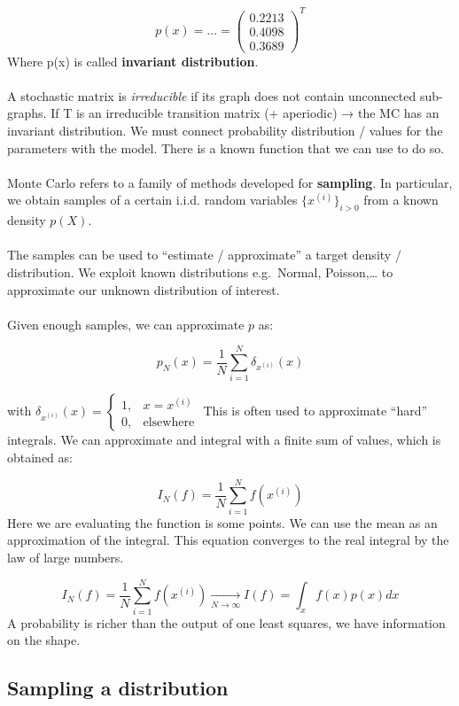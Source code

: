 $$
p(x)=\dots = \begin{pmatrix} 0.2213 \\ 0.4098 \\ 0.3689\end{pmatrix}^T
$$
Where p(x) is called \textbf{invariant distribution}.
\\
\\
\noindent
A stochastic matrix is \emph{irreducible} if its graph does not contain
unconnected sub-graphs. If T is an irreducible transition matrix (+ aperiodic) → the MC has an
invariant distribution.
\noindent
We must connect probability distribution / values for the parameters
with the model. There is a known function that we can use to do so.
\\
\\
\noindent
Monte Carlo refers to a family of methods developed for
\textbf{sampling}. In particular, we obtain samples of a certain i.i.d.
random variables $\{x^{(i)}\}_{i>0}$ from a known density $p(X)$.
\\
\\
\noindent
The samples can be used to ``estimate / approximate'' a target density /
distribution. We exploit known distributions e.g.~Normal,
Poisson,\ldots{} to approximate our unknown distribution of interest.
\\
\\
\noindent
Given enough samples, we can approximate $p$ as:

$$
p_N(x)= \frac{1}{N}\sum^N_{i=1}\delta_{x^{(i)}}(x)
$$

with
$\delta_{x^{(i)}}(x)= \begin{cases}1, & x=x^{(i)} \\ 0, & \text{elsewhere}\end{cases}$
\noindent
This is often used to approximate ``hard'' integrals. We can approximate
and integral with a finite sum of values, which is obtained as:

$$
I_N(f)=\frac{1}{N} \sum^N_{i=1} f(x^{(i)})
$$
\noindent
Here we are evaluating the function is some points. We can use the mean
as an approximation of the integral. This equation converges to the real
integral by the law of large numbers.

$$
I_N(f)=\frac{1}{N} \sum^N_{i=1} f(x^{(i)})  \xrightarrow[N \rightarrow \infty  ]{}   I(f)= \int_x f(x)p(x)dx
$$
\noindent
A probability is richer than the output of one least squares, we have
information on the shape.


\subsection{Sampling a distribution}

